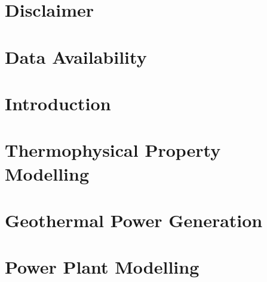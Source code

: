 \documentclass{Configuration_Files/PoliMi3i_thesis}
\begin{document}
\chapter*{Disclaimer}
    

\chapter*{Data Availability}
    



\thispagestyle{empty}
\tableofcontents %
\thispagestyle{empty}
\cleardoublepage


\mainmatter %


\chapter{Introduction}
\label{ch:introduction}%
   

\chapter{Thermophysical Property Modelling}
\label{ch:thermophysmodelling}%
    

\chapter{Geothermal Power Generation}
\label{ch:power_generation}%
   

\chapter{Power Plant Modelling}
\label{ch:PowerCycle}%
   
\end{document}
